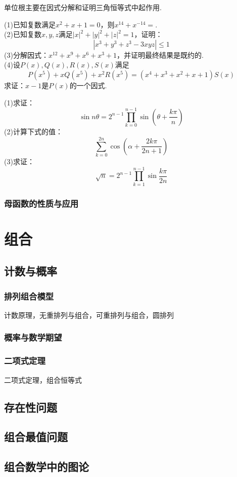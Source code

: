 \documentclass[lang=cn, zihao=5]{elegantbook}
\newcommand{\ssb}[1]{\left( #1 \right)}
\newcommand{\tk}{\uline{\hspace{4em}}}
\begin{document}
单位根主要在因式分解和证明三角恒等式中起作用.

\begin{example}
	(1)已知复数满足$x^2+x+1=0$，则$x^{14}+x^{-14}=$\tk . \\
	(2)已知复数$x,y,z$满足$|x|^2+|y|^2+|z|^2=1$，证明：$$|x^3+y^3+z^3-3xyz| \leq 1$$
	(3)分解因式：$x^{12}+x^9+x^6+x^3+1$，并证明最终结果是既约的. \\
	(4)设$P(x),Q(x),R(x),S(x)$满足$$P(x^5)+xQ(x^5)+x^2R(x^5)=(x^4+x^3+x^2+x+1)S(x)$$
	求证：$x-1$是$P(x)$的一个因式.
\end{example}

\begin{example}
	(1)求证：$$\sin n\theta = 2^{n-1} \prod_{k=0}^{n-1}\sin \ssb{\theta + \frac{k\pi}{n}}$$
	(2)计算下式的值：$$\sum_{k=0}^{2n} \cos \ssb{\alpha + \frac{2k\pi}{2n+1}}$$
	(3)求证：$$\sqrt{n} = 2^{n-1} \prod_{k=1}^{n-1} \sin \frac{k\pi}{2n}$$
\end{example}


\section{母函数的性质与应用}



\part{组合}

\chapter{计数与概率}

\section{排列组合模型}

计数原理，无重排列与组合，可重排列与组合，圆排列

\section{概率与数学期望}

\section{二项式定理}

二项式定理，组合恒等式

\chapter{存在性问题}

\chapter{组合最值问题}

\chapter{组合数学中的图论}
\end{document}
